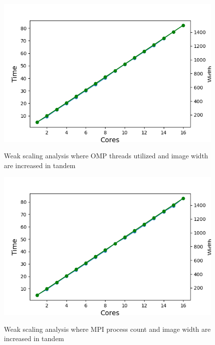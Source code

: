 \begin{figure}[h]
  \centering
  \begin{minipage}{0.45\linewidth}
      \includegraphics[width=\linewidth]{figs/omp_weak2.out}
      \caption{Weak scaling analysis where OMP threads utilized and image width are increased in tandem
	  }
        \label{fig:omp_weak2}
    \end{minipage}
  \hspace{.05\linewidth}
 \begin{minipage}{0.45\linewidth}
  \includegraphics[width=\linewidth]{figs/mpi_weak2.out}
 \caption{Weak scaling analysis where MPI process count and image width are increased in tandem}
    \label{fig:mpi_weak2}

\end{minipage}
\end{figure}
